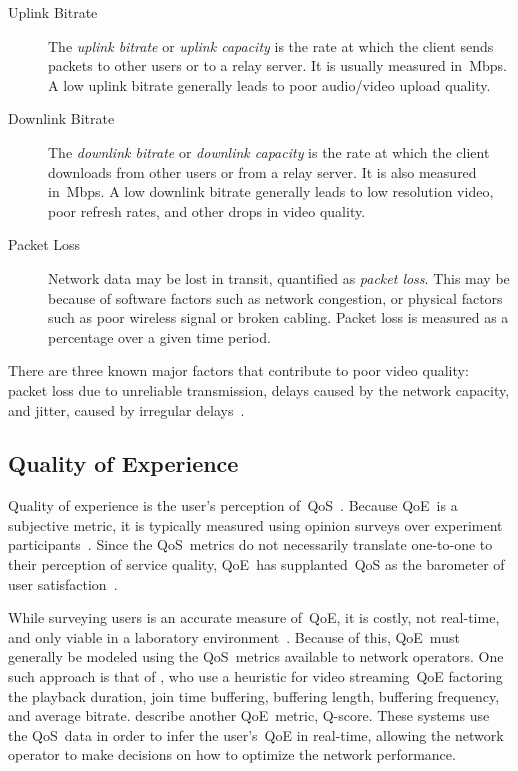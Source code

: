         \begin{description}
            \item[Uplink Bitrate] The \emph{uplink bitrate} or \emph{uplink capacity} is the rate at which the client sends packets to other users or to a relay server. It is usually measured in~Mbps. A low uplink bitrate generally leads to poor audio/video upload quality.

            \item[Downlink Bitrate] The \emph{downlink bitrate} or \emph{downlink capacity} is the rate at which the client downloads from other users or from a relay server. It is also measured in~Mbps. A low downlink bitrate generally leads to low resolution video, poor refresh rates, and other drops in video quality.

            \item[Packet Loss] Network data may be lost in transit, quantified as \emph{packet loss}. This may be because of software factors such as network congestion, or physical factors such as poor wireless signal or broken cabling. Packet loss is measured as a percentage over a given time period.
        \end{description}

        There are three known major factors that contribute to poor video quality: packet loss due to unreliable transmission, delays caused by the network capacity, and jitter, caused by irregular delays~\autocite{ChenYanjiao2015FQtQ}.

    \subsection{Quality of Experience}\label{introduction:qoe}
        Quality of experience is the user's perception of~QoS~\autocite{ChenYanjiao2015FQtQ}. Because QoE~is a subjective metric, it is typically measured using opinion surveys over experiment participants~\autocite{ChenYanjiao2015FQtQ,RodrriguezDemóstenesZ2014Vqai}. Since the QoS~metrics do not necessarily translate one-to-one to their perception of service quality, QoE~has supplanted~QoS as the barometer of user satisfaction~\autocite{DinakiHosseinEbrahimi2021FVQW}.

        While surveying users is an accurate measure of~QoE, it is costly, not real-time, and only viable in a laboratory environment~\autocite{ChenYanjiao2015FQtQ,SongHan2011Qpsq}. Because of this, QoE~must generally be modeled using the QoS~metrics available to network operators. One such approach is that of \textcite{DinakiHosseinEbrahimi2021FVQW}, who use a heuristic for video streaming~QoE factoring the playback duration, join time buffering, buffering length, buffering frequency, and average bitrate. \Textcite{SongHan2011Qpsq} describe another QoE~metric, Q-score. These systems use the QoS~data in order to infer the user's~QoE in real-time, allowing the network operator to make decisions on how to optimize the network performance.

